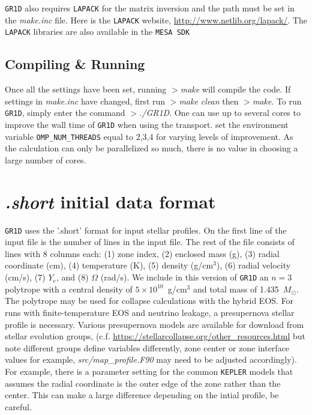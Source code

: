 \documentclass[10pt,nofootinbib]{article}
\newcommand{\code}[1]{\texttt{#1}}
\begin{document}
\code{GR1D} also requires \code{LAPACK} for the matrix inversion and
the path must be set in the \emph{make.inc} file.  Here is the
\code{LAPACK} website, \url{http://www.netlib.org/lapack/}.  The
\code{LAPACK} libraries are also available in the \code{MESA SDK}

\subsection{Compiling \& Running}
Once all the settings have been set, running {\emph{$>$make}} will
compile the code.  If settings in {\emph{make.inc}} have changed,
first run {\emph{$>$make clean}} then {\emph{$>$make}}.  To run
\code{GR1D}, simply enter the command {\emph{$>$./GR1D}}. One can use
up to several cores to improve the wall time of \code{GR1D} when using
the transport.  set the environment variable \code{OMP\_NUM\_THREADS}
equal to 2,3,4 for varying levels of improvement.  As the calculation
can only be parallelized so much, there is no value in choosing a
large number of cores.
 
\section{{\it.short} initial data format}
\code{GR1D} uses the '.short' format for input stellar profiles. On
the first line of the input file is the number of lines in the input
file.  The rest of the file consists of lines with 8 columns each: (1)
zone index, (2) enclosed mass (g), (3) radial coordinate (cm), (4)
temperature (K), (5) density (g/cm$^3$), (6) radial velocity (cm/s),
(7) $Y_e$, and (8) $\Omega$ (rad/s). We include in this version of
\code{GR1D} an $n=3$ polytrope with a central density of
$5\times10^{10}$~g/cm$^3$ and total mass of 1.435~$M_\odot$. The
polytrope may be used for collapse calculations with the hybrid
EOS. For runs with finite-temperature EOS and neutrino leakage, a
presupernova stellar profile is necessary.  Various presupernova
models are available for download from stellar evolution groups,
(c.f. \mbox{\url{https://stellarcollapse.org/other_resources.html}} but note
different groups define variables differently, zone center or zone
interface values for example, {\emph{src/map\_profile.F90}} may need to
be adjusted accordingly). For example, there is a parameter setting
for the common \code{KEPLER} models that assumes the radial coordinate
is the outer edge of the zone rather than the center.  This can make a
large difference depending on the intial profile, be careful.
\end{document}
